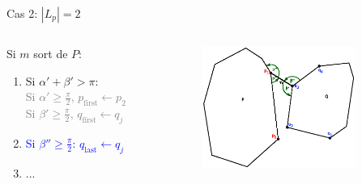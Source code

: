 \documentclass{beamer}
\begin{document}
\begin{frame}{Cas 2: $|L_p| = 2$}
	\begin{columns}[c]
	\begin{column}[T]{.5\textwidth}
		Si $m$ sort de $P$:
		\begin{enumerate}
		\item Si $\alpha' + \beta' > \pi$:\\
			\hspace{0.3cm} \textcolor{gray}{Si $\alpha' \geq \frac{\pi}{2}$, $p_{\text{first}} \leftarrow p_{2}$}\\
			\hspace{0.3cm} \textcolor{gray}{Si $\beta' \geq \frac{\pi}{2}$, $q_{\text{first}} \leftarrow q_{j}$}
		\item \textcolor{blue}{Si $\beta'' \geq \frac{\pi}{2}$: $q_{\text{last}} \leftarrow q_{j}$}
		\item ...
		\end{enumerate}
	\end{column}
	\begin{column}[T]{.5\textwidth}
		\includegraphics[width=5cm]{dmin2_1.eps}
	\end{column}
	\end{columns}
\end{frame}
\end{document}
